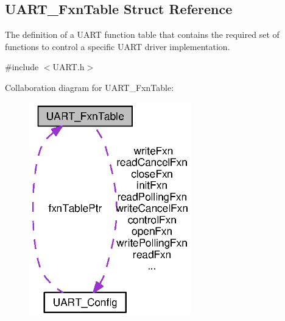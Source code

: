 \subsection{U\-A\-R\-T\-\_\-\-Fxn\-Table Struct Reference}
\label{struct_u_a_r_t___fxn_table}


The definition of a U\-A\-R\-T function table that contains the required set of functions to control a specific U\-A\-R\-T driver implementation.  




{\ttfamily \#include $<$U\-A\-R\-T.\-h$>$}



Collaboration diagram for U\-A\-R\-T\-\_\-\-Fxn\-Table\-:
\nopagebreak
\begin{figure}[H]
\begin{center}
\leavevmode
\includegraphics[width=199pt]{struct_u_a_r_t___fxn_table__coll__graph}
\end{center}
\end{figure}
